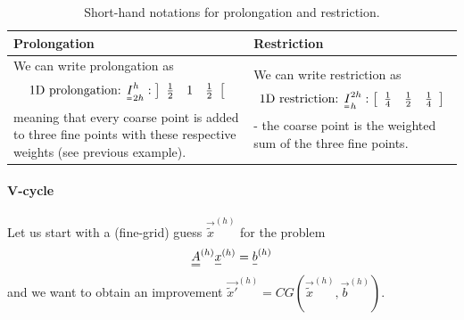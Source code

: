 \begin{table}[H]
    \centering
    \begin{tabular}{|p{}|p{}|}
        \hline
        \textbf{Prolongation} & \textbf{Restriction} \\
        \hline
        We can write prolongation as
        \begin{equation}
            \text{1D prolongation: } \mat{I}_{2h}^{h}: \left] \begin{array}{lll} \frac{1}{2} & 1 & \frac{1}{2} \end{array} \right[
        \end{equation}
        meaning that every coarse point is added to three fine points with these respective weights (see previous example). &
        We can write restriction as
        \begin{equation}
            \text{1D restriction: } \mat{I}_{h}^{2h}: \left[ \begin{array}{lll} \frac{1}{4} & \frac{1}{2} & \frac{1}{4} \end{array} \right]
        \end{equation}
        - the coarse point is the weighted sum of the three fine points. \\
        \hline
    \end{tabular}
    \caption{Short-hand notations for prolongation and restriction.}
    \label{tab:pro_res_short_s}
\end{table}

\paragraph*{V-cycle}
Let us start with a (fine-grid) guess $\vec{\tilde{x}}^{(h)}$ for the problem
\begin{equation}
    \mat{A}^{(h)} \vec{x}^{(h)} = \vec{b}^{(h)}
\end{equation}
and we want to obtain an improvement $\vec{\tilde{x}'}^{(h)} = CG(\vec{\tilde{x}}^{(h)}, \vec{b}^{(h)})$.

